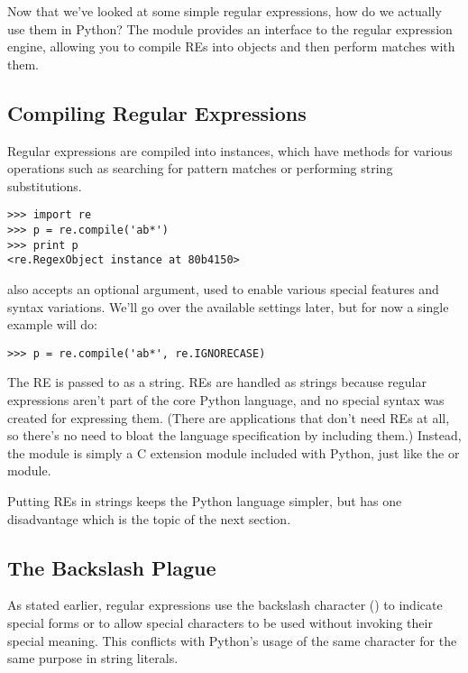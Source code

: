 \documentclass{howto}
\begin{document}
Now that we've looked at some simple regular expressions, how do we
actually use them in Python?  The  module provides an
interface to the regular expression engine, allowing you to compile
REs into objects and then perform matches with them.

\subsection{Compiling Regular Expressions}

Regular expressions are compiled into  instances,
which have methods for various operations such as searching for
pattern matches or performing string substitutions.

\begin{verbatim}
>>> import re
>>> p = re.compile('ab*')
>>> print p
<re.RegexObject instance at 80b4150>
\end{verbatim}

 also accepts an optional 
argument, used to enable various special features and syntax
variations.  We'll go over the available settings later, but for now a
single example will do:

\begin{verbatim}
>>> p = re.compile('ab*', re.IGNORECASE)
\end{verbatim}

The RE is passed to  as a string.  REs are
handled as strings because regular expressions aren't part of the core
Python language, and no special syntax was created for expressing
them.  (There are applications that don't need REs at all, so there's
no need to bloat the language specification by including them.)
Instead, the  module is simply a C extension module
included with Python, just like the  or 
module.

Putting REs in strings keeps the Python language simpler, but has one
disadvantage which is the topic of the next section.

\subsection{The Backslash Plague}

As stated earlier, regular expressions use the backslash
character (\character{\e}) to indicate special forms or to allow
special characters to be used without invoking their special meaning.
This conflicts with Python's usage of the same character for the same
purpose in string literals.
\end{document}
